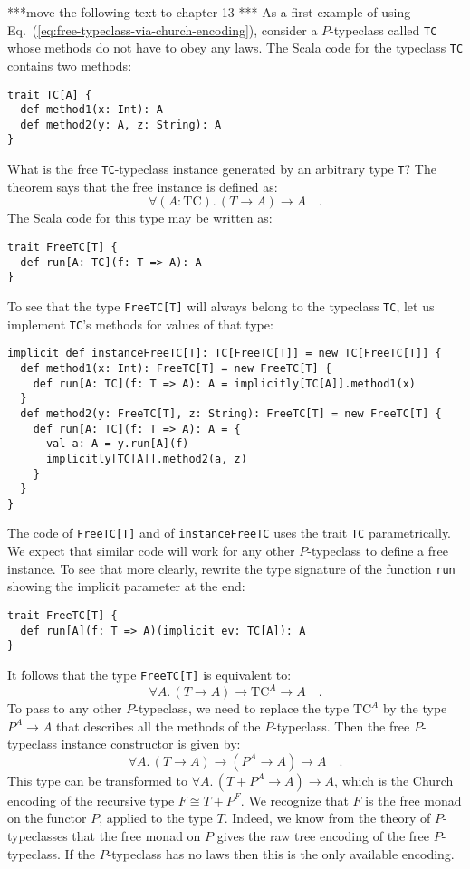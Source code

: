 {*}{*}{*}move the following text to chapter 13 {*}{*}{*} As a first
example of using Eq.~(\ref{eq:free-typeclass-via-church-encoding}),
consider a $P$-typeclass called \lstinline!TC! whose methods do
not have to obey any laws. The Scala code for the typeclass \lstinline!TC!
contains two methods:
\begin{lstlisting}
trait TC[A] {
  def method1(x: Int): A
  def method2(y: A, z: String): A
}
\end{lstlisting}
What is the free \lstinline!TC!-typeclass instance generated by an
arbitrary type \lstinline!T!? The theorem says that the free instance
is defined as:
\[
\forall(A:\text{TC}).\,(T\rightarrow A)\rightarrow A\quad.
\]
The Scala code for this type may be written as:
\begin{lstlisting}
trait FreeTC[T] {
  def run[A: TC](f: T => A): A
}
\end{lstlisting}
To see that the type \lstinline!FreeTC[T]! will always belong to
the typeclass \lstinline!TC!, let us implement \lstinline!TC!\textsf{'}s
methods for values of that type:
\begin{lstlisting}
implicit def instanceFreeTC[T]: TC[FreeTC[T]] = new TC[FreeTC[T]] {
  def method1(x: Int): FreeTC[T] = new FreeTC[T] {
    def run[A: TC](f: T => A): A = implicitly[TC[A]].method1(x)
  }
  def method2(y: FreeTC[T], z: String): FreeTC[T] = new FreeTC[T] {
    def run[A: TC](f: T => A): A = {
      val a: A = y.run[A](f)
      implicitly[TC[A]].method2(a, z)
    }
  }
}
\end{lstlisting}

The code of \lstinline!FreeTC[T]! and of \lstinline!instanceFreeTC!
uses the trait \lstinline!TC! parametrically. We expect that similar
code will work for any other $P$-typeclass to define a free instance.
To see that more clearly, rewrite the type signature of the function
\lstinline!run! showing the implicit parameter at the end:
\begin{lstlisting}
trait FreeTC[T] {
  def run[A](f: T => A)(implicit ev: TC[A]): A
}
\end{lstlisting}
It follows that the type \lstinline!FreeTC[T]! is equivalent to:
\[
\forall A.\,(T\rightarrow A)\rightarrow\text{TC}^{A}\rightarrow A\quad.
\]
To pass to any other $P$-typeclass, we need to replace the type $\text{TC}^{A}$
by the type $P^{A}\rightarrow A$ that describes all the methods of
the $P$-typeclass. Then the free $P$-typeclass instance constructor
is given by:
\[
\forall A.\,(T\rightarrow A)\rightarrow(P^{A}\rightarrow A)\rightarrow A\quad.
\]
This type can be transformed to $\forall A.\,(T+P^{A}\rightarrow A)\rightarrow A$,
which is the Church encoding of the recursive type $F\cong T+P^{F}$.
We recognize that $F$ is the free monad on the functor $P$, applied
to the type $T$. Indeed, we know from the theory of $P$-typeclasses
that the free monad on $P$ gives the raw tree encoding of the free
$P$-typeclass. If the $P$-typeclass has no laws then this is the
only available encoding.

